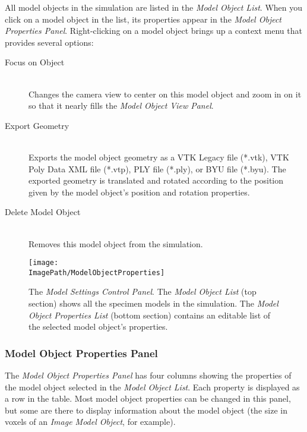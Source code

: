 \documentclass[11pt,titlepage,twoside]{article}
\begin{document}
All model objects in the simulation are listed in the \emph{Model Object List}. When you click on a model object in the list, its properties appear in the \emph{Model Object Properties Panel}. Right-clicking on a model object brings up a context menu that provides several options:

\begin{description}

  \item[Focus on Object] \hfill \\
  Changes the camera view to center on this model object and zoom in on it so that it nearly fills the \emph{Model Object View Panel}.
  
  \item[Export Geometry] \hfill \\
  Exports the model object geometry as a VTK Legacy file (*.vtk), VTK Poly Data XML file (*.vtp), PLY file (*.ply), or BYU file (*.byu). The exported geometry is translated and rotated according to the position given by the model object's position and rotation properties.
  
  \item[Delete Model Object] \hfill \\
  Removes this model object from the simulation.

\end{description}

\begin{figure}[htbp] %
   \centering
   \texttt{[image: \\ImagePath/ModelObjectProperties]} 
   \caption{The \emph{Model Settings Control Panel}. The \emph{Model Object List} (top section) shows all the specimen models in the simulation. The \emph{Model Object Properties List} (bottom section) contains an editable list of the selected model object's properties.}
   \label{fig:example}
\end{figure}

\subsubsection{Model Object Properties Panel}
\label{sec:ModelObjectPropertiesPanel}

The \emph{Model Object Properties Panel} has four columns showing the properties of the model object selected in the \emph{Model Object List}. Each property is displayed as a row in the table. Most model object properties can be changed in this panel, but some are there to display information about the model object (the size in voxels of an \emph{Image Model Object}, for example).
\end{document}
